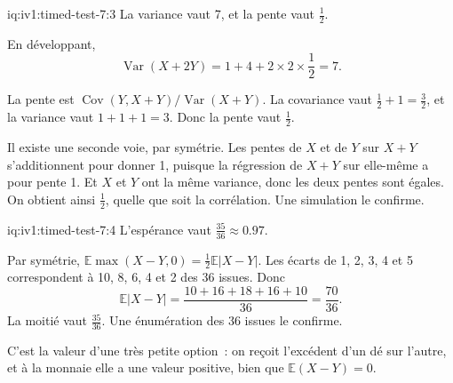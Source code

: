 \begin{solution}{iq:iv1:timed-test-7:3}
La variance vaut 7, et la pente vaut $\frac12$.

En développant,
\[
\operatorname{Var}(X + 2Y) = 1 + 4 + 2 \times 2 \times \frac12 = 7.
\]

La pente est $\operatorname{Cov}(Y, X + Y)/\operatorname{Var}(X + Y)$. La covariance vaut $\frac12 + 1 = \frac32$, et la variance vaut $1 + 1 + 1 = 3$. Donc la pente vaut $\frac12$.

Il existe une seconde voie, par symétrie. Les pentes de $X$ et de $Y$ sur $X + Y$ s'additionnent pour donner 1, puisque la régression de $X + Y$ sur elle-même a pour pente 1. Et $X$ et $Y$ ont la même variance, donc les deux pentes sont égales. On obtient ainsi $\frac12$, quelle que soit la corrélation. Une simulation le confirme.

\end{solution}

\begin{solution}{iq:iv1:timed-test-7:4}
L'espérance vaut $\frac{35}{36} \approx 0.97$.

Par symétrie, $\mathbb{E}\max(X - Y, 0) = \frac12\mathbb{E}|X - Y|$. Les écarts de 1, 2, 3, 4 et 5 correspondent à 10, 8, 6, 4 et 2 des 36 issues. Donc
\[
\mathbb{E}|X - Y| = \frac{10 + 16 + 18 + 16 + 10}{36} = \frac{70}{36}.
\]
La moitié vaut $\frac{35}{36}$. Une énumération des 36 issues le confirme.

C'est la valeur d'une très petite option~: on reçoit l'excédent d'un dé sur l'autre, et à la monnaie elle a une valeur positive, bien que $\mathbb{E}(X - Y) = 0$.


\end{solution}

